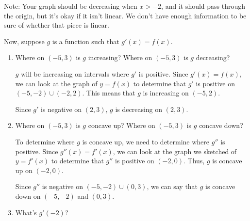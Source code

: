 \documentclass{article}
\begin{document}
\begin{enumerate}
\begin{enumerate}
\begin{solution}
      Note: Your graph should be decreasing when $x > -2$, and it should pass through the origin, but it's okay if it isn't linear. We don't have enough information to be sure of whether that piece is linear.
    \end{solution}

  \end{enumerate}

  Now, suppose $g$ is a function such that $g'(x) = f(x)$.

  \begin{enumerate}[resume]
  \item


    \begin{problem}[\stretch{0.3}]
      Where on $(-5, 3)$ is $g$ increasing? Where on $(-5, 3)$ is $g$ decreasing?
    \end{problem}

    \begin{solution}
      $g$ will be increasing on intervals where $g'$ is positive. 
      Since $g'(x)=f(x)$, we can look at the graph of $y=f(x)$ to determine
      that $g'$ is positive on $(-5, -2) \cup (-2, 2)$. This means that $g$ is
      increasing on $(-5, 2)$.

      Since $g'$ is negative on $(2, 3)$, $g$ is decreasing on $(2, 3)$. 
      
    \end{solution}

  \item
    \begin{problem}[\stretch{0.3}]
      Where on $(-5, 3)$ is $g$ concave up? Where on $(-5, 3)$ is $g$ concave down? 
    \end{problem}

    \begin{solution}
      To determine where $g$ is concave up, we need to determine where $g''$ is
      positive. Since $g''(x) = f'(x)$, we can look at the graph we sketched of
      $y=f'(x)$ to determine that $g''$ is positive on $(-2, 0)$. Thus,
      $g$ is concave up on $(-2, 0)$. 

      Since $g''$ is negative on $(-5, -2) \cup (0, 3)$, we can say that
      $g$ is concave down on $(-5, -2)$ and $(0, 3)$. 
    \end{solution}

  \item
    \begin{problem}[\newpage]
      What's $g'(-2)$?
    \end{problem}


\end{enumerate}
\end{enumerate}
\end{document}
